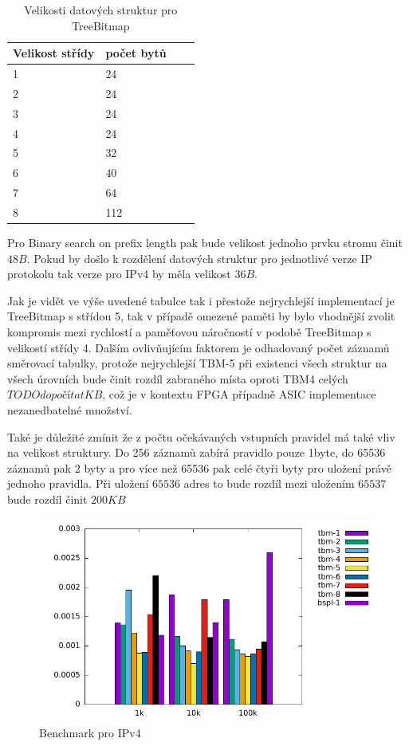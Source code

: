 \begin{table}[!htb]
	\center
	\label{tab:lpm-input}
	\caption{Velikosti datových struktur pro TreeBitmap}
    \begin{tabular}{|l|l|l|l|}
    \hline
    Velikost střídy & počet bytů \\ \hline
    1 & 24 \\ \hline
    2 & 24 \\ \hline
    3 & 24 \\ \hline
    4 & 24 \\ \hline
    5 & 32 \\ \hline
    6 & 40 \\ \hline
    7 & 64 \\ \hline
    8 & 112 \\ \hline
    \end{tabular}
\end{table}

Pro Binary search on prefix length pak bude velikost jednoho prvku stromu činit $48B$.
Pokud by došlo k rozdělení datových struktur pro jednotlivé verze IP protokolu
tak verze pro IPv4 by měla velikost $36B$.

Jak je vidět ve výše uvedené tabulce tak i přestože nejrychlejší implementací je TreeBitmap s střídou 5,
tak v případě omezené paměti by bylo vhodnější zvolit kompromis mezi rychlostí a paměťovou náročností v podobě
TreeBitmap s velikostí střídy 4. Dalším ovlivňujícím faktorem je odhadovaný počet záznamů směrovací tabulky, protože
nejrychlejší TBM-5 při existenci všech struktur na všech úrovních bude činit rozdíl zabraného místa oproti TBM4
celých $TODO dopočítat KB$, což je v kontextu FPGA případně ASIC implementace nezanedbatelné množství.

Také je důležité zmínit že z počtu očekávaných vstupních pravidel má také vliv na velikost struktury.
Do 256 záznamů zabírá pravidlo pouze 1byte, do 65536 záznamů pak 2 byty a pro více než 65536 pak celé čtyři byty pro uložení právě jednoho pravidla. Při uložení $65536$ adres to bude rozdíl mezi uložením $65537$ bude rozdíl činit
$200KB$

\begin{figure}[!htb]
	\centering
	\includegraphics[scale=1]{fig/lpm-ipv4.pdf}
	\caption{Benchmark pro IPv4}
\end{figure}\label{fig:lpm-ipv4}

